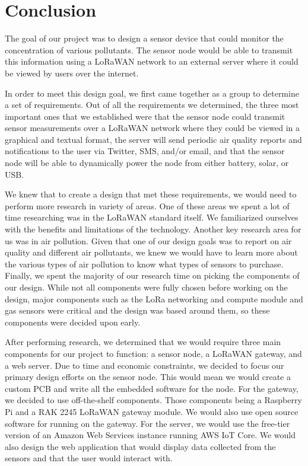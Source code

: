 \section{Conclusion}
The goal of our project was to design a sensor device that could monitor the concentration of various pollutants. The sensor node would be able to transmit this information using a LoRaWAN network to an external server where it could be viewed by users over the internet.

In order to meet this design goal, we first came together as a group to determine a set of requirements. Out of all the requirements we determined, the three most important ones that we established were that the sensor node could transmit sensor measurements over a LoRaWAN network where they could be viewed in a graphical and textual format, the server will send periodic air quality reports and notifications to the user via Twitter, SMS, and/or email, and that the sensor node will be able to dynamically power the node from either battery, solar, or USB. 

We knew that to create a design that met these requirements, we would need to perform more research in variety of areas. One of these areas we spent a lot of time researching was in the LoRaWAN standard itself. We familiarized ourselves with the benefits and limitations of the technology. Another key research area for us was in air pollution. Given that one of our design goals was to report on air quality and different air pollutants, we knew we would have to learn more about the various types of air pollution to know what types of sensors to purchase. Finally, we spent the majority of our research time on picking the components of our design. While not all components were fully chosen before working on the design, major components such as the LoRa networking and compute module and gas sensors were critical and the design was based around them, so these components were decided upon early.

After performing research, we determined that we would require three main components for our project to function: a sensor node, a LoRaWAN gateway, and a web server. Due to time and economic constraints, we decided to focus our primary design efforts on the sensor node. This would mean we would create a custom PCB and write all the embedded software for the node. For the gateway, we decided to use off-the-shelf components. Those components being a Raspberry Pi and a RAK 2245 LoRaWAN gateway module. We would also use open source software for running on the gateway. For the server, we would use the free-tier version of an Amazon Web Services instance running AWS IoT Core. We would also design the web application that would display data collected from the sensors and that the user would interact with.

